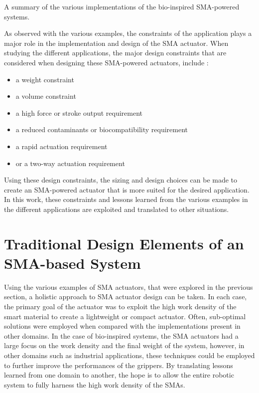 \begin{table}[hbt]
    \centering
    \caption{A summary of the various implementations of the bio-inspired SMA-powered systems.}
    
    \label{tab:bioinspired-subsystems-examples}
\end{table}

As observed with the various examples, the constraints of the application plays a major role in the implementation and design of the SMA actuator. When studying the different applications, the major design constraints that are considered when designing these SMA-powered actuators, include :
\begin{itemize}
    \item a weight constraint
    \item a volume constraint
    \item a high force or stroke output requirement
    \item a reduced contaminants or biocompatibility requirement
    \item a rapid actuation requirement
    \item or a two-way actuation requirement
\end{itemize}
Using these design constraints, the sizing and design choices can be made to create an SMA-powered actuator that is more suited for the desired application. In this work, these constraints and lessons learned from the various examples in the different applications are exploited and translated to other situations.

\section{Traditional Design Elements of an SMA-based System}
Using the various examples of SMA actuators, that were explored in the previous section, a holistic approach to SMA actuator design can be taken. In each case, the primary goal of the actuator was to exploit the high work density of the smart material to create a lightweight or compact actuator. Often, sub-optimal solutions were employed when compared with the implementations present in other domains. In the case of bio-inspired systems, the SMA actuators had a large focus on the work density and the final weight of the system, however, in other domains such as industrial applications, these techniques could be employed to further improve the performances of the grippers. By translating lessons learned from one domain to another, the hope is to allow the entire robotic system to fully harness the high work density of the SMAs.

